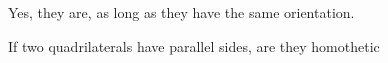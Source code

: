 








Yes, they are, as long as they have the same orientation.


If two quadrilaterals have parallel sides, are they homothetic














